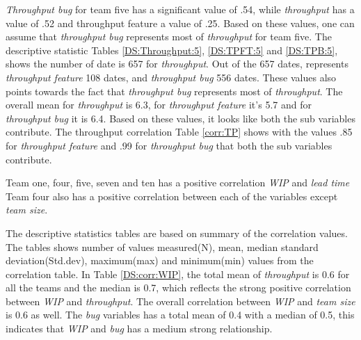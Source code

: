 \documentclass[UKenglish]{ifimaster}  %
\begin{document}
\textit{Throughput bug} for team five has a significant value of .54, while \textit{throughput} has a value of .52 and throughput feature a value of .25. Based on these values, one can assume that \textit{throughput bug} represents most of \textit{throughput} for team five. The descriptive statistic Tables \ref{DS:Throughput:5}, \ref{DS:TPFT:5} and \ref{DS:TPB:5}, shows the number of date is 657 for \textit{throughput}. Out of the 657 dates, represents \textit{throughput feature} 108 dates, and \textit{throughput bug} 556 dates. These values also points towards the fact that \textit{throughput bug} represents most of \textit{throughput}. The overall mean for \textit{throughput} is 6.3, for \textit{throughput feature} it's 5.7 and for \textit{throughput bug} it is 6.4. Based on these values, it looks like both the sub variables contribute. The throughput correlation Table \ref{corr:TP} shows with the values .85 for \textit{throughput feature} and .99 for \textit{throughput bug} that both the sub variables contribute.

Team one, four, five, seven and ten has a positive correlation \textit{WIP} and \textit{lead time} Team four also has a positive correlation between each of the variables except \textit{team size}.


The descriptive statistics tables are based on summary of the correlation values. The tables shows number of values measured(N), mean, median standard deviation(Std.dev), maximum(max)  and minimum(min) values from the correlation table.
In Table \ref{DS:corr:WIP}, the total mean of \textit{throughput} is 0.6 for all the teams and the median is 0.7, which reflects the strong positive correlation between \textit{WIP} and \textit{throughput}.  The overall correlation between \textit{WIP} and \textit{team size}  is 0.6 as well. The \textit{bug} variables has a total mean of 0.4 with a median of 0.5, this indicates that \textit{WIP} and \textit{bug} has a medium strong relationship. 
\end{document}
